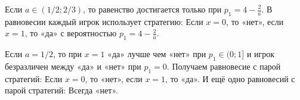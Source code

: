 \begin{enumerate}
Если $ a\in (1/2;2/3) $, то равенство достигается только при $ p_{1}=4-\frac{2}{a} $. В равновесии каждый игрок использует стратегию: Если $ x=0 $, то «нет», если $ x=1 $, то «да» с вероятностью $ p_{1}=4-\frac{2}{a}  $.

Если $ a=1/2 $, то при $ x=1 $ «да» лучше чем «нет» при $ p_{1}\in (0;1] $ и игрок безразличен между «да» и «нет» при $ p_{1}=0 $. Получаем равновесие с парой стратегий: Если $ x=0 $, то «нет», если $ x=1 $, то «да». И ещё одно равновесий с парой стратегий: Всегда «нет».

\end{enumerate}
